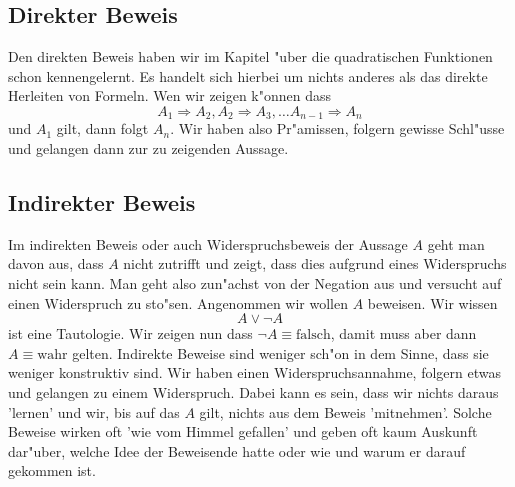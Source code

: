 \subsection{Direkter Beweis}
Den direkten Beweis haben wir im Kapitel "uber die quadratischen Funktionen schon kennengelernt. Es handelt sich hierbei um nichts anderes als das direkte Herleiten von Formeln. Wen wir zeigen k"onnen dass 
\begin{equation*}
A_1 \Rightarrow A_2, A_2 \Rightarrow A_3, \ldots A_{n-1} \Rightarrow A_n
\end{equation*}
und $A_1$ gilt, dann folgt $A_n$. Wir haben also Pr"amissen, folgern gewisse Schl"usse und gelangen dann zur zu zeigenden Aussage.

\subsection{Indirekter Beweis}
Im indirekten Beweis oder auch Widerspruchsbeweis der Aussage $A$ geht man davon aus, dass $A$ nicht zutrifft und zeigt, dass dies aufgrund eines Widerspruchs nicht sein kann. Man geht also zun"achst von der Negation aus und versucht auf einen Widerspruch zu sto"sen. Angenommen wir wollen $A$ beweisen. Wir wissen
\begin{equation*}
A \lor \neg A
\end{equation*}
ist eine Tautologie. Wir zeigen nun dass $\neg A \equiv \text{falsch}$, damit muss aber dann $A \equiv \text{wahr}$ gelten. Indirekte Beweise sind weniger sch"on in dem Sinne, dass sie weniger konstruktiv sind. Wir haben einen Widerspruchsannahme, folgern etwas und gelangen zu einem Widerspruch. Dabei kann es sein, dass wir nichts daraus 'lernen' und wir, bis auf das $A$ gilt, nichts aus dem Beweis 'mitnehmen'. Solche Beweise wirken oft 'wie vom Himmel gefallen' und geben oft kaum Auskunft dar"uber, welche Idee der Beweisende hatte oder wie und warum er darauf gekommen ist.

